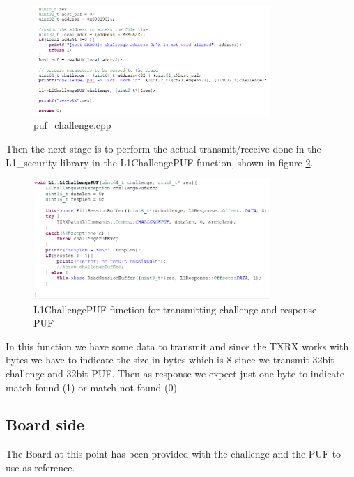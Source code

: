 \begin{figure}[h!]
	\vspace{0.5cm}
	\includegraphics[width = 0.8\textwidth]{images/puf_challenge.png}
	\caption{puf\_challenge.cpp}
	\label{fig:puf_challenge.cpp}
\end{figure}

Then the next stage is to perform the actual transmit/receive done in the L1\_security library in the L1ChallengePUF function, shown in figure \ref{fig:L1ChallengePUF}.

\begin{figure}[h!]
	\vspace{0.5cm}
	\includegraphics[width = 0.8\textwidth]{images/L1ChallengePUF.png}
	\caption{L1ChallengePUF function for transmitting challenge and response PUF}
	\label{fig:L1ChallengePUF}
\end{figure}

In this function we have some data to transmit and since the TXRX works with bytes we have to indicate the size in bytes which is 8 since we transmit 32bit challenge and 32bit PUF. Then as response we expect just one byte to indicate match found (1) or match not found (0).

\subsection{Board side}

The Board at this point has been provided with the challenge and the PUF to use as reference.

